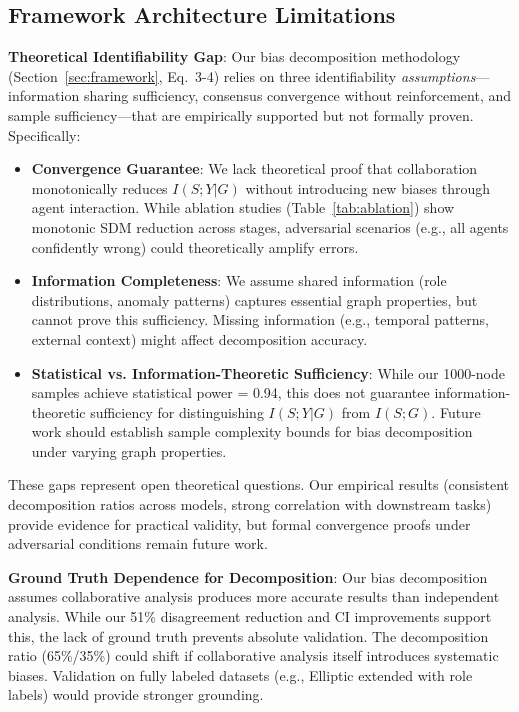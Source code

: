 \documentclass[conference]{IEEEtran}
\begin{document}
\subsection{Framework Architecture Limitations}

\textbf{Theoretical Identifiability Gap}: Our bias decomposition methodology (Section~\ref{sec:framework}, Eq.~3-4) relies on three identifiability \textit{assumptions}---information sharing sufficiency, consensus convergence without reinforcement, and sample sufficiency---that are empirically supported but not formally proven. Specifically:
\begin{itemize}
    \item \textbf{Convergence Guarantee}: We lack theoretical proof that collaboration monotonically reduces $I(S; Y | G)$ without introducing new biases through agent interaction. While ablation studies (Table~\ref{tab:ablation}) show monotonic SDM reduction across stages, adversarial scenarios (e.g., all agents confidently wrong) could theoretically amplify errors.
    \item \textbf{Information Completeness}: We assume shared information (role distributions, anomaly patterns) captures essential graph properties, but cannot prove this sufficiency. Missing information (e.g., temporal patterns, external context) might affect decomposition accuracy.
    \item \textbf{Statistical vs. Information-Theoretic Sufficiency}: While our 1000-node samples achieve statistical power = 0.94, this does not guarantee information-theoretic sufficiency for distinguishing $I(S; Y | G)$ from $I(S; G)$. Future work should establish sample complexity bounds for bias decomposition under varying graph properties.
\end{itemize}
These gaps represent open theoretical questions. Our empirical results (consistent decomposition ratios across models, strong correlation with downstream tasks) provide evidence for practical validity, but formal convergence proofs under adversarial conditions remain future work.

\textbf{Ground Truth Dependence for Decomposition}: Our bias decomposition assumes collaborative analysis produces more accurate results than independent analysis. While our 51\% disagreement reduction and CI improvements support this, the lack of ground truth prevents absolute validation. The decomposition ratio (65\%/35\%) could shift if collaborative analysis itself introduces systematic biases. Validation on fully labeled datasets (e.g., Elliptic extended with role labels) would provide stronger grounding.
\end{document}
